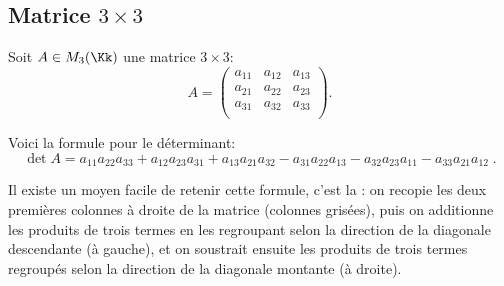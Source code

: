 \documentclass[class=report,crop=false]{standalone}
\begin{document}
%
%


\subsection{Matrice $3 \times 3$}

Soit $A \in M_3(\Kk)$ une matrice $3 \times 3$:
$$A = \begin{pmatrix}
      a_{11} & a_{12} & a_{13} \\
      a_{21} & a_{22} & a_{23} \\
      a_{31} & a_{32} & a_{33} \\
      \end{pmatrix}.$$

Voici la formule pour le déterminant:
$$\det A =
a_{11} a_{22} a_{33}
+ a_{12} a_{23} a_{31}
+ a_{13} a_{21} a_{32}
- a_{31} a_{22} a_{13}
- a_{32} a_{23} a_{11}
- a_{33} a_{21} a_{12}\; .$$

Il existe un moyen facile de retenir cette formule, c'est la 
 :
on recopie les deux premières colonnes à droite de la matrice (colonnes grisées),
puis on additionne les produits de trois termes en les regroupant selon la direction
de la diagonale descendante (à gauche), et on soustrait ensuite les produits de trois termes
regroupés selon la direction de la diagonale montante (à droite).
\end{document}
